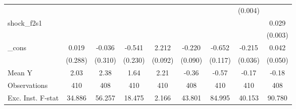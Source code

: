 {\begin{tabular}{l*{8}{c}}
            &                     &                     &                     &                     &                     &                     &     (0.004)         &                     \\
\addlinespace
shock\_f2s1  &                     &                     &                     &                     &                     &                     &                     &       0.029\sym{***}\\
            &                     &                     &                     &                     &                     &                     &                     &     (0.003)         \\
\addlinespace
\_cons      &       0.019         &      -0.036         &      -0.541\sym{**} &       2.212\sym{***}&      -0.220\sym{**} &      -0.652\sym{***}&      -0.215\sym{***}&       0.042         \\
            &     (0.288)         &     (0.310)         &     (0.230)         &     (0.092)         &     (0.090)         &     (0.117)         &     (0.036)         &     (0.050)         \\
\midrule
Mean Y      &        2.03         &        2.38         &        1.64         &        2.21         &       -0.36         &       -0.57         &       -0.17         &       -0.18         \\
Observations&         410         &         408         &         410         &         410         &         408         &         410         &         410         &         408         \\
Exc. Inst. F-stat&      34.886         &      56.257         &      18.475         &       2.166         &      43.801         &      84.995         &      40.153         &      90.780         \\
\bottomrule
\end{tabular}
}
